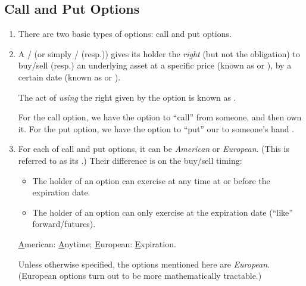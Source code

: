 \subsection{Call and Put Options}
\begin{enumerate}
\item There are two basic types of options: call and put options.

\item A / (or simply /
(resp.))  gives its holder the \emph{right} (but not the
obligation) to buy/sell (resp.) an underlying asset  at a
specific price (known as  or ), by a
certain date (known as  or ).

\begin{note}
The act of \emph{using} the right given by the option is known as
.
\end{note}

\begin{mnemonic}
For the call option, we have the option to ``call''  from
someone, and then own it. For the put option, we have the option to ``put'' our
 to someone's hand .
\end{mnemonic}

\item For each of call and put options, it can be \emph{American} or
\emph{European}. (This is referred to as its .) Their
difference is on the buy/sell timing:
\begin{itemize}
\item The holder of an  option can exercise at any time at or before the expiration date.
\item The holder of an  option can only exercise at the expiration date (``like'' forward/futures).
\end{itemize}
\begin{mnemonic}
\underline{A}merican: \underline{A}nytime; \underline{E}uropean: \underline{E}xpiration.
\end{mnemonic}

\begin{note}
Unless otherwise specified, the options mentioned here are \emph{European}.
(European options turn out to be more mathematically tractable.)
\end{note}


\end{enumerate}
